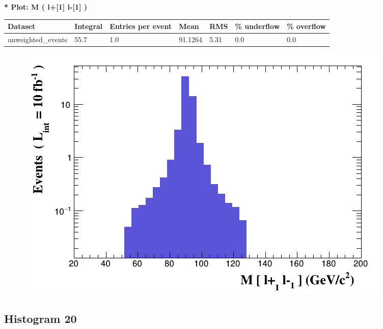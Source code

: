 \documentclass[a4paper, 10pt]{article}
\begin{document}
\textbf{* Plot: M ( l+[1] l-[1] ) }\\
   \begin{table}[H]
  \begin{center}
    \begin{tabular}{|m{23.0mm}|m{23.0mm}|m{18.0mm}|m{19.0mm}|m{19.0mm}|m{19.0mm}|m{19.0mm}|}
      \hline
      {\cellcolor{yellow}         Dataset}& {\cellcolor{yellow}         Integral}& {\cellcolor{yellow}         Entries per event}& {\cellcolor{yellow}         Mean}& {\cellcolor{yellow}         RMS}& {\cellcolor{yellow}         \% underflow}& {\cellcolor{yellow}         \% overflow}\\
      \hline
      {\cellcolor{white}         unweighted\_events}& {\cellcolor{white}         55.7}& {\cellcolor{white}         1.0}& {\cellcolor{white}         91.1264}& {\cellcolor{white}         5.31}& {\cellcolor{green}         0.0}& {\cellcolor{green}         0.0}\\
\hline
    \end{tabular}
  \end{center}
\end{table}

\begin{figure}[H]
  \begin{center}
    \includegraphics[scale=0.45]{selection_18.png}\\
\caption{   }
  \end{center}
\end{figure}
      \newpage
\subsection{ Histogram 20}
\end{document}
